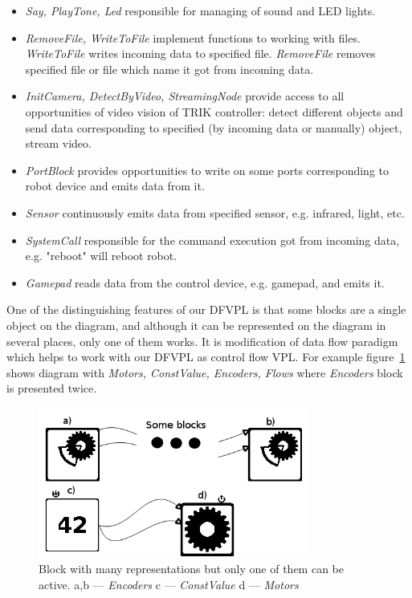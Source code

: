 \documentclass[conference,compsoc]{IEEEtran}
\begin{document}
\begin{itemize}
\begin{itemize}
\item \textit{Say, PlayTone, Led} responsible for managing of sound and LED lights.
\item \textit{RemoveFile, WriteToFile} implement functions to working with files. \textit{WriteToFile} writes incoming data to specified file. \textit{RemoveFile} removes specified file or file which name it got from incoming data.
\item \textit{InitCamera, DetectByVideo, StreamingNode} provide access to all opportunities of video vision of TRIK controller: detect different objects and send data corresponding to specified (by incoming data or manually) object, stream video.
\item \textit{PortBlock} provides opportunities to write on some ports corresponding to robot device and emits data from it.
\item \textit{Sensor} continuously emits data from specified sensor, e.g. infrared, light, etc.
\item \textit{SystemCall} responsible for the command execution got from incoming data, e.g. "reboot" will reboot robot.
\item \textit{Gamepad} reads data from the control device, e.g. gamepad, and emits it.
\end{itemize} 
\end{itemize} 


One of the distinguishing features of our DFVPL is that some blocks are a single object on the diagram, and although it can be represented on the diagram in several places, only one of them works. It is modification of data flow paradigm which helps to work with our DFVPL as control flow VPL. For example figure~\ref{image:encoder} shows diagram with \textit{Motors, ConstValue, Encoders, Flows} where \textit{Encoders} block is presented twice. 

\begin{figure}[ht]
	\centering
	\includegraphics[width=3.5in]{Encoders.png}
	\caption{Block with many representations but only one of them can be active. a,b --- \textit{Encoders} c --- \textit{ConstValue} d --- \textit{Motors}}
	\label{image:encoder}
\end{figure}
\end{document}
